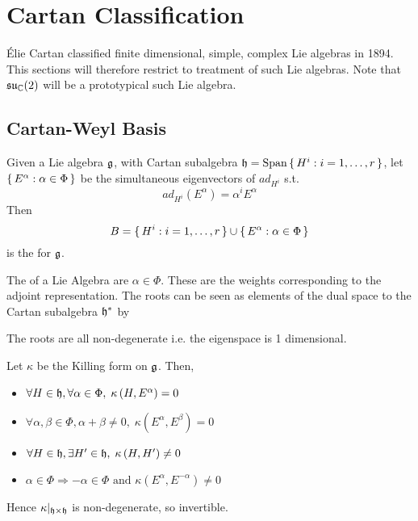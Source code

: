 \documentclass{article}
\begin{document}
\section{Cartan Classification}
\'Elie Cartan classified finite dimensional, simple, complex Lie algebras in 1894. This sections will therefore restrict to treatment of such Lie algebras. Note that $\mathfrak{su}_{\mathbb{C}}(2)$ will be a prototypical such Lie algebra. 

\subsection{Cartan-Weyl Basis}

\begin{definition}
Given a Lie algebra $\mathfrak{g}$, with Cartan subalgebra $\mathfrak{h}=\operatorname{Span}\set{ H^i : i=1,\dots,r }$, let $\set{  E^\alpha : \alpha\in\Phi  }$ be the simultaneous eigenvectors of $ad_{H^i}$ s.t. 
\[
ad_{H^i}\left(E^\alpha \right)=\alpha^i E^\alpha
\]
Then 
\[
B=\set{  H^i : i=1,\dots,r } \cup \set{  E^\alpha : \alpha\in\Phi  }
\]
is the  for $\mathfrak{g}$.
\end{definition}

\begin{definition}[Roots]
The  of a Lie Algebra are $\alpha\in\Phi$.
These are the weights corresponding to the adjoint representation. The roots can be seen as elements of the dual space to the Cartan subalgebra $\mathfrak{h}^\ast$ by 
\end{definition}

\begin{fact}
The roots are all non-degenerate i.e. the eigenspace is 1 dimensional. 
\end{fact}

\begin{theorem}
Let $\kappa$ be the Killing form on $\mathfrak{g}$. Then, 
\begin{itemize}
    \item $\forall H\in\mathfrak{h}, \forall\alpha\in\Phi, \; \kappa\left(H,E^\alpha\right)=0 $
    \item $\forall\alpha,\beta\in\Phi, \alpha+\beta\neq0, \; \kappa\left(E^\alpha,E^\beta\right)=0$
    \item $\forall H\in\mathfrak{h}, \exists H^\prime\in\mathfrak{h}, \; \kappa\left(H,H^\prime\right)\neq0$
    \item $\alpha\in\Phi \Rightarrow -\alpha\in\Phi \text{ and } \kappa\left(E^\alpha,E^{-\alpha}\right)\neq0$
\end{itemize}
Hence $\kappa|_{\mathfrak{h}\times\mathfrak{h}}$ is non-degenerate, so invertible. 
\end{theorem}
\end{document}
